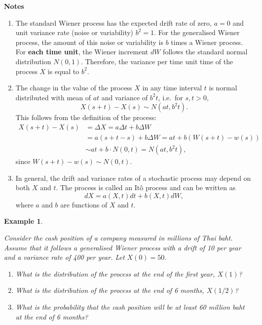 \documentclass[landscape, 20pt]{extreport}
\theoremstyle{definition}
\theoremstyle{definition}
\newtheorem{example}{Example}[chapter]
\theoremstyle{definition}
\theoremstyle{definition}
\theoremstyle{remark}
\begin{document}
\textbf{Notes}

\begin{enumerate}
\def\labelenumi{\arabic{enumi}.}
\item
  The standard Wiener process has the expected drift rate of zero,
  \(a = 0\) and unit variance rate (noise or variability) \(b^2 = 1\). For
  the generalised Wiener process, the amount of this noise or
  variability is \(b\) times a Wiener process. For \textbf{each time unit},
  the Wiener increment \(dW\) follows the standard normal distribution
  \(N(0,1)\). Therefore, the variance per time unit time of the process
  \(X\) is equal to \(b^2\).
\item
  The change in the value of the process \(X\) in any time interval \(t\)
  is normal distributed with mean of \(at\) and variance of \(b^2 t\),
  i.e.~for \(s, t > 0\), \[X(s + t) - X(s) \sim N(at , b^2 t).\] This
  follows from the definition of the process: \[\begin{aligned}
    X(s + t) - X(s)   &= \Delta X  = a \Delta t + b \Delta W\\
                          &= a (s + t  - s) + b  \Delta W = a t + b (W(s + t) - w(s)) \\
                      &\sim at + b \cdot N(0, t) = N(at, b^2 t),\end{aligned}\]
  since \(W(s + t) - w(s) \sim N(0,t)\).
\item
  In general, the drift and variance rates of a stochastic process may
  depend on both \(X\) and \(t\). The process is called an Itô process and
  can be written as \[dX = a(X,t) dt + b(X,t) dW,\] where \(a\) and \(b\)
  are functions of \(X\) and \(t\).
\end{enumerate}

\newpage \begin{example}
\protect\hypertarget{exm:unlabeled-div-70}{}\label{exm:unlabeled-div-70}

\emph{Consider the cash position of a company measured in
millions of Thai baht. Assume that it follows a generalised Wiener
process with a drift of 10 per year and a variance rate of 400 per year.
Let \(X(0) = 50\).}

\begin{enumerate}
\def\labelenumi{\arabic{enumi}.}
\item
  \emph{What is the distribution of the process at the end of the first
  year, \(X(1)\)?}
\item
  \emph{What is the distribution of the process at the end of 6 months,
  \(X(1/2)\)?}
\item
  \emph{What is the probability that the cash position will be at least 60
  million baht at the end of 6 months?}
\end{enumerate}

\end{example}
\end{document}
